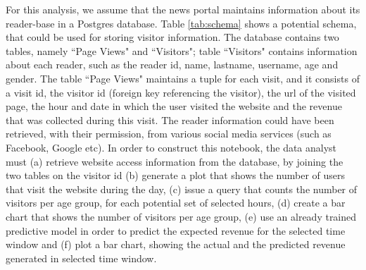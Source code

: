 For this analysis, we assume that the news portal maintains information about its reader-base in a Postgres database. Table \ref{tab:schema} shows a potential schema, that could be used for storing visitor information. The database contains two tables, namely ``Page Views" and ``Visitors"; table ``Visitors" contains information about each reader, such as the reader id, name, lastname, username, age and gender. The table ``Page Views" maintains a tuple for each visit, and it consists of a visit id, the visitor id (foreign key referencing the visitor), the url of the visited page, the hour and date in which the user visited the website and the revenue that was collected during this visit. The reader information could have been retrieved, with their permission, from various social media services (such as Facebook, Google etc). In order to construct this notebook, the data analyst must (a) retrieve  website access information from the database, by joining the two tables on the visitor id (b) generate a plot that shows the number of users that visit the website during the day, (c) issue a query that counts the number of visitors per age group, for each potential set of selected hours, (d) create a bar chart that shows the number of visitors per age group, (e) use an already trained predictive model in order to predict the expected revenue for the selected time window and (f) plot a bar chart, showing the actual and the predicted revenue generated in selected time window. 



